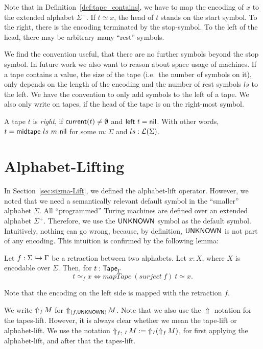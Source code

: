 Note that in Definition~\ref{def:tape_contains}, we have to map the encoding of $x$ to the extended alphabet $\Sigma^+$.  If $t \simeq x$, the head of
$t$ stands on the start symbol.  To the right, there is the encoding terminated by the stop-symbol.  To the left of the head, there may be arbitrary
many ``rest'' symbols.

We find the convention useful, that there are no further symbols beyond the stop symbol.  In future work we also want to reason about space usage of
machines.  If a tape contains a value, the size of the tape (i.e.\ the number of symbols on it), only depends on the length of the encoding and the
number of rest symbols $ls$ to the left.  We have the convention to only add symbols to the left of a tape.  We also only write on tapes, if the head
of the tape is on the right-most symbol.

\begin{definition}
  \label{def:isRght}
  A tape $t$ is \emph{right}, if $\MS{current}(t) \neq \None$ and $\MS{left}~t=\nil$.  With other words, $t = \MS{midtape}~ls~m~\nil$ for some
  $m:\Sigma$ and $ls:\List(\Sigma)$.
\end{definition}

\section{Alphabet-Lifting}
\label{sec:LiftAlphabet-UNKNOWN}

In Section~\ref{sec:sigma-Lift}, we defined the alphabet-lift operator.  However, we noted that we need a semantically relevant default symbol in the
``smaller'' alphabet $\Sigma$.  All ``programmed'' Turing machines are defined over an extended alphabet $\Sigma^+$.  Therefore, we use the
$\MS{UNKNOWN}$ symbol as the default symbol.  Intuitively, nothing can go wrong, because, by definition, $\MS{UNKNOWN}$ is not part of any encoding.
This intuition is confirmed by the following lemma:
\begin{lemma}
  \label{lem:contains_translate_tau}
  Let $f: \Sigma \hookrightarrow \Tau$ be a retraction between two alphabets.  Let $x:X$, where $X$ is encodable over $\Sigma$. Then, for
  $t:\Tape_\Tau$
  \[
    t \simeq_f x \iff mapTape~(surject~f)~t \simeq x.
  \]
\end{lemma}
Note that the encoding on the left side is mapped with the retraction $f$.

We write $\LiftAlphabet{M}{f}$ for $\LiftAlphabet{M}{(f, \MS{UNKNOWN})}$.  Note that we also use the $\Uparrow$ notation for the tapes-lift.  However,
it is always clear whether we mean the tape-lift or alphabet-lift.  We use the notation $\LiftBoth{M}{f}{I} := \LiftTapes{(\LiftAlphabet{M}{f})}{I}$,
for first applying the alphabet-lift, and after that the tapes-lift.

